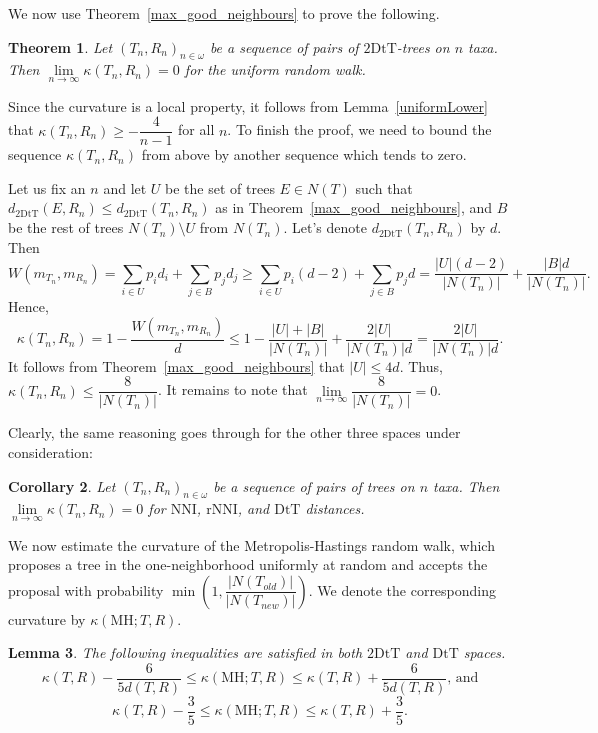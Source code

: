 \documentclass{amsart}
\newtheorem{lemma}{Lemma}
\newtheorem{corollary}[lemma]{Corollary}
\newtheorem{theorem}[lemma]{Theorem}
\theoremstyle{definition}
\newcommand{\dts}{\mathrm{2DtT}}
\newcommand{\nni}{\mathrm{NNI}}
\newcommand{\rnni}{\mathrm{rNNI}}
\newcommand{\dtt}{\mathrm{DtT}}
\newcommand{\MH}{\mathrm{MH}}
\begin{document}
We now use Theorem~\ref{max_good_neighbours} to prove the following.


\begin{theorem}\label{zero-in-the-limit}
Let $(T_n,R_n)_{n\in\omega}$ be a sequence of pairs of $\dts$-trees on $n$ taxa.
Then $\lim\limits_{n \to \infty}\kappa(T_n,R_n) = 0$ for the uniform random walk.
\end{theorem}

\proof
Since the curvature is a local property, it follows from Lemma~\ref{uniformLower} that $\kappa(T_n,R_n) \geq -\dfrac{4}{n-1}$ for all $n$.
To finish the proof, we need to bound the sequence $\kappa(T_n,R_n)$ from above by another sequence which tends to zero.

Let us fix an $n$ and let $U$ be the set of trees $E \in N(T)$ such that $d_\dts(E,R_n) \leq d_\dts(T_n,R_n)$ as in Theorem~\ref{max_good_neighbours}, and $B$ be the rest of trees $N(T_n)\setminus U$ from $N(T_n)$.
Let's denote $d_\dts(T_n,R_n)$ by $d$.
Then
\[
W(m_{T_n},m_{R_n}) = \sum_{i\in U} p_i d_i + \sum_{j\in B} p_j d_j \geq
\sum_{i\in U} p_i (d-2) + \sum_{j\in B} p_j d =
\frac{|U|(d-2)}{|N(T_n)|} + \frac{|B|d}{|N(T_n)|}.
\]
Hence,
\[
\kappa(T_n,R_n) = 1 - \frac{W(m_{T_n},m_{R_n})}{d} \leq
1 - \frac{|U| + |B|}{|N(T_n)|} + \frac{2|U|}{|N(T_n)|d}
= \frac{2|U|}{|N(T_n)|d}.
\]
It follows from Theorem~\ref{max_good_neighbours} that $|U| \leq 4d$.
Thus, $\kappa(T_n,R_n) \leq \dfrac{8}{|N(T_n)|}$.
It remains to note that $\lim\limits_{n\to\infty}\dfrac{8}{|N(T_n)|} = 0$.
\endproof

Clearly, the same reasoning goes through for the other three spaces under consideration:

\begin{corollary}
Let $(T_n,R_n)_{n\in\omega}$ be a sequence of pairs of trees on $n$ taxa.
Then $\lim\limits_{n \to \infty}\kappa(T_n,R_n) = 0$ for $\nni$, $\rnni$, and $\dtt$ distances.
\end{corollary}

We now estimate the curvature of the Metropolis-Hastings random walk, which proposes a tree in the one-neighborhood uniformly at random and accepts the proposal with probability $\min\left(1, \dfrac{|N(T_{old})|}{|N(T_{new})|}\right)$.
We denote the corresponding curvature by $\kappa(\MH;T,R)$.

\begin{lemma}
The following inequalities are satisfied in both $\dts$ and $\dtt$ spaces.
\[
\kappa(T,R) - \dfrac{6}{5d(T,R)} \leq \kappa(\MH;T,R) \leq \kappa(T,R) +
\dfrac{6}{5d(T,R)}\mbox{, and}
\]
\[
\kappa(T,R) - \dfrac35 \leq \kappa(\MH;T,R) \leq \kappa(T,R) + \dfrac35.
\]
\end{lemma}
\end{document}
